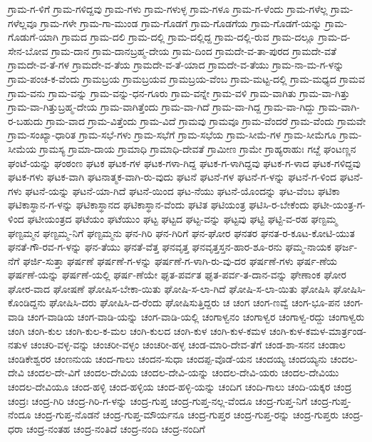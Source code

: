 ಗ್ರಾಮ-ಗ-ಳಿಗೆ
ಗ್ರಾಮ-ಗಳಿದ್ದವು
ಗ್ರಾಮ-ಗಳು
ಗ್ರಾಮ-ಗಳುಳ್ಳ
ಗ್ರಾಮ-ಗಳೂ
ಗ್ರಾಮ-ಗ-ಳೆಂದು
ಗ್ರಾಮ-ಗಳೆಲ್ಲ
ಗ್ರಾಮ-ಗಳೆಲ್ಲವೂ
ಗ್ರಾಮ-ಗಳೇ
ಗ್ರಾಮ-ಗಾ-ಮುಂಡ
ಗ್ರಾಮ-ಗೊಡಗೆ
ಗ್ರಾಮ-ಗೊಡಗೆಯ
ಗ್ರಾಮ-ಗೊಡಗೆ-ಯನ್ನು
ಗ್ರಾಮ-ಗೊಡುಗೆ-ಯಾಗಿ
ಗ್ರಾಮದ
ಗ್ರಾಮ-ದಲಿ
ಗ್ರಾಮ-ದಲ್ಲಿ
ಗ್ರಾಮ-ದಲ್ಲಿದ್ದ
ಗ್ರಾಮ-ದಲ್ಲಿ-ರುವ
ಗ್ರಾಮ-ದಲ್ಲೂ
ಗ್ರಾಮ-ದ-ಸೇನ-ಬೋವ
ಗ್ರಾಮ-ದಾನ
ಗ್ರಾಮ-ದಾನಬ್ರಹ್ಮ-ದೇಯ
ಗ್ರಾಮ-ದಿಂದ
ಗ್ರಾಮದೇ-ವ-ತಾ-ಪುರದ
ಗ್ರಾಮದೇ-ವತೆ
ಗ್ರಾಮದೇ-ವ-ತೆ-ಗಳ
ಗ್ರಾಮದೇ-ವ-ತೆಯ
ಗ್ರಾಮದೇ-ವ-ತೆ-ಯಾದ
ಗ್ರಾಮದೇ-ವ-ತೆಯು
ಗ್ರಾಮ-ನಾ-ಮ-ಗ-ಳನ್ನು
ಗ್ರಾಮ-ಪಂಚ-ಕ-ವೆಂದು
ಗ್ರಾಮಬ್ರಯ
ಗ್ರಾಮಬ್ರಯವ
ಗ್ರಾಮಬ್ರಯ-ವೆಂಬ
ಗ್ರಾಮ-ಮಟ್ಟ-ದಲ್ಲಿ
ಗ್ರಾಮ-ಮಧ್ಯದ
ಗ್ರಾಮವ
ಗ್ರಾಮ-ವನು
ಗ್ರಾಮ-ವನ್ನು
ಗ್ರಾಮ-ವನ್ನು-ಧನ-ಗೂರು
ಗ್ರಾಮ-ವನ್ನೇ
ಗ್ರಾಮ-ವಳಿ
ಗ್ರಾಮ-ವಾಗಿತು
ಗ್ರಾಮ-ವಾ-ಗಿತ್ತು
ಗ್ರಾಮ-ವಾ-ಗಿತ್ತುಬ್ರಹ್ಮ-ದೇಯ
ಗ್ರಾಮ-ವಾಗಿತ್ತೆಂದು
ಗ್ರಾಮ-ವಾ-ಗಿದೆ
ಗ್ರಾಮ-ವಾ-ಗಿದ್ದ
ಗ್ರಾಮ-ವಾ-ಗಿದ್ದು
ಗ್ರಾಮ-ವಾಗಿ-ರ-ಬಹುದು
ಗ್ರಾಮ-ವಾದ
ಗ್ರಾಮ-ವಿತ್ತೆಂದು
ಗ್ರಾಮ-ವಿದೆ
ಗ್ರಾಮವು
ಗ್ರಾಮವೂ
ಗ್ರಾಮ-ವೆಂದರೆ
ಗ್ರಾಮ-ವೆಂದು
ಗ್ರಾಮವೇ
ಗ್ರಾಮ-ಸಂಖ್ಯಾ-ಧಾರಿತ
ಗ್ರಾಮ-ಸಭೆ-ಗಳು
ಗ್ರಾಮ-ಸಭೆಗೆ
ಗ್ರಾಮ-ಸಭೆಯ
ಗ್ರಾಮ-ಸೀಮೆ-ಗಳ
ಗ್ರಾಮ-ಸೀಮೆಗೂ
ಗ್ರಾಮ-ಸೀಮೆಯ
ಗ್ರಾಮಸ್ಯ
ಗ್ರಾಮಾ-ದಾಯ
ಗ್ರಾಮಾಧಿ
ಗ್ರಾಮಾಧಿ-ದೇವತೆ
ಗ್ರಾಮೀಣ
ಗ್ರಾಮೇ
ಗ್ರಾಹ್ಯರಾಹುಃ
ಗೞ್ದೆ
ಘಂಟಣ್ಣನ
ಘಂಟೆ-ಯನ್ನು
ಘಂಠಂಣ
ಘಟಕ
ಘಟಕ-ಗಳ
ಘಟಕ-ಗಳಾ-ಗಿದ್ದ
ಘಟಕ-ಗ-ಳಾಗಿದ್ದವು
ಘಟಕ-ಗ-ಳಾದ
ಘಟಕ-ಗಳಿದ್ದವು
ಘಟಕ-ಗಳು
ಘಟಕ-ವಾಗಿ
ಘಟನಾತ್ಮಕ-ವಾಗಿ-ರು-ವುದು
ಘಟನೆ
ಘಟನೆ-ಗಳ
ಘಟನೆ-ಗ-ಳನ್ನು
ಘಟನೆ-ಗ-ಳಿಂದ
ಘಟನೆ-ಗಳು
ಘಟನೆ-ಯನ್ನು
ಘಟನೆ-ಯಾ-ಗಿದೆ
ಘಟನೆ-ಯಿಂದ
ಘಟ-ನೆಯು
ಘಟನೆ-ಯೊಂದನ್ನು
ಘಟ-ವೆಂಬ
ಘಟಿಕಾ
ಘಟಿಕಾಸ್ಥಾನ-ಗ-ಳನ್ನು
ಘಟಿಕಾಸ್ಥಾನದ
ಘಟಿಕಾಸ್ಥಾನ-ವೆಂದು
ಘಟಿತ
ಘಟಿಯಂತ್ರ
ಘಟಿಸಿ-ರ-ಬೇಕೆಂದು
ಘಟೀ-ಯಂತ್ರ-ಗ-ಳಿಂದ
ಘಟೀಯಂತ್ರದ
ಘಟೆಯಂ
ಘಟೆಯುಂ
ಘಟ್ಟ
ಘಟ್ಟದ
ಘಟ್ಟ-ವನ್ನು
ಘಟ್ಟವು
ಘಟ್ಟಿ
ಘಟ್ಟಿ-ವ-ರಹ
ಘಣ್ಟಮ್ಮ
ಘಣ್ಟಮ್ಮನ
ಘಣ್ಟಮ್ಮ-ನಿಗೆ
ಘಣ್ಟಮ್ಮನು
ಘನ-ಗಿರಿ
ಘನ-ಗಿರಿಗೆ
ಘನ-ಘೋರ
ಘನತರ
ಘನತ-ರ-ಕೂಟ-ಕೋಟಿ-ಯುತ
ಘನತೆ-ಗೌ-ರವ-ಗ-ಳನ್ನು
ಘನ-ತೆಯು
ಘನತೆ-ವೆತ್ತ
ಘನವೃತ್ತ
ಘನವೃತ್ತಸ್ತನ-ಹಾರ-ಶೂ-ರನು
ಘಮ್ಮ-ನಾಯಕ
ಘರ್ಜ-ನೆಗೆ
ಘರ್ಜಿ-ಸುತ್ತಾ
ಘರ್ಷಣೆ
ಘರ್ಷಣೆ-ಗ-ಳನ್ನು
ಘರ್ಷಣೆ-ಗ-ಳಾಗಿ-ರು-ವು-ದರ
ಘರ್ಷಣೆ-ಗಳು
ಘರ್ಷ-ಣೆಯ
ಘರ್ಷಣೆ-ಯನ್ನು
ಘರ್ಷಣೆ-ಯಲ್ಲಿ
ಘರ್ಷ-ಣೆಯೇ
ಘೃತ-ಪರ್ವತ
ಘೃತ-ಪರ್ವ-ತ-ದಾನ-ವನ್ನು
ಘೇಣಾಂಕ
ಘೋರ
ಘೋರ-ವಾದ
ಘೋಷಣೆ
ಘೋಷಿಸ-ಬೇಕಾ-ಯಿತು
ಘೋಷಿ-ಸ-ಲಾ-ಗಿದೆ
ಘೋಷಿ-ಸ-ಲಾ-ಯಿತು
ಘೋಷಿಸಿ
ಘೋಷಿಸಿ-ಕೊಂಡಿದ್ದನು
ಘೋಷಿಸಿ-ದರು
ಘೋಷಿಸಿ-ದ-ರೆಂದು
ಘೋಷಿಸುತ್ತಿದ್ದರು
ಚ
ಚಂಗ
ಚಂಗ-ಣವ್ವೆ
ಚಂಗ-ಭೂ-ಪನ
ಚಂಗ-ವಾಡಿ
ಚಂಗ-ವಾಡಿಯ
ಚಂಗ-ವಾಡಿ-ಯನ್ನು
ಚಂಗ-ವಾಡಿ-ಯಲ್ಲಿ
ಚಂಗಾಳ್ವನಂ
ಚಂಗಾಳ್ವರ
ಚಂಗಾಳ್ವ-ರದ್ದು
ಚಂಗಾಳ್ವರು
ಚಂಗಿ
ಚಂಗಿ-ಕುಲ
ಚಂಗಿ-ಕುಲ-ಕ-ಮಲ
ಚಂಗಿ-ಕುಲದ
ಚಂಗಿ-ಕುಳ
ಚಂಗಿ-ಕುಳ-ಕಮಳ
ಚಂಗಿ-ಕುಳ-ಕಮಳ-ಮಾರ್ತ್ರಂಡ-ನತುಳ
ಚಂಚರಿ-ವಳ್ಳ-ವನ್ನು
ಚಂಚರೀ-ವಳ್ಳಂ
ಚಂಚರೀ-ಹಳ್ಳ
ಚಂಡ-ಮಾರಿ-ದೇವ-ತೆಗೆ
ಚಂಡ-ಶಾ-ಸನನ
ಚಂಡಾಲ
ಚಂಡಿಕೇಶ್ವರರ
ಚಂಣನುಯ
ಚಂದ-ಗಾಲು
ಚಂದನ-ಸುಧಾ
ಚಂದಪ್ಪ-ವೊಡೆ-ಯನ
ಚಂದಯ್ಯ
ಚಂದಯ್ಯನು
ಚಂದಲ-ದೇವಿ
ಚಂದಲ-ದೇ-ವಿಗೆ
ಚಂದಲ-ದೇವಿಯ
ಚಂದಲ-ದೇವಿ-ಯನ್ನು
ಚಂದಲ-ದೇವಿ-ಯರು
ಚಂದಲ-ದೇವಿಯು
ಚಂದಲ-ದೇವಿಯೂ
ಚಂದ-ಹಳ್ಳಿ
ಚಂದ-ಹಳ್ಳಿಯ
ಚಂದ-ಹಳ್ಳಿ-ಯನ್ನು
ಚಂದಿಗ
ಚಂದಿ-ಗಾಲು
ಚಂದಿ-ಯಕ್ಕರ
ಚಂದ್ರ
ಚಂದ್ರಃ
ಚಂದ್ರ-ಗಿರಿ
ಚಂದ್ರ-ಗಿರಿ-ಗ-ಳನ್ನು
ಚಂದ್ರ-ಗುಪ್ತ
ಚಂದ್ರ-ಗುಪ್ತ-ನಲ್ಲ-ವೆಂದೂ
ಚಂದ್ರ-ಗುಪ್ತ-ನಿಗೆ
ಚಂದ್ರ-ಗುಪ್ತ-ನೆಂದೂ
ಚಂದ್ರ-ಗುಪ್ತ-ನೊಡನೆ
ಚಂದ್ರ-ಗುಪ್ತ-ಮೌರ್ಯನೂ
ಚಂದ್ರ-ಗುಪ್ತರ
ಚಂದ್ರ-ಗುಪ್ತ-ರನ್ನು
ಚಂದ್ರ-ಗುಪ್ತರು
ಚಂದ್ರ-ಧರಾ
ಚಂದ್ರ-ನಂತಹ
ಚಂದ್ರ-ನಂತಿದೆ
ಚಂದ್ರ-ನಂದಿ
ಚಂದ್ರ-ನಂದಿಗೆ
